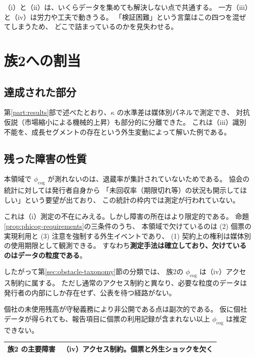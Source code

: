 （i）と（ii）は、いくらデータを集めても解決しない点で共通する。
一方（iii）と（iv）は労力や工夫で動きうる。
「検証困難」という言葉はこの四つを混ぜてしまうため、
どこで詰まっているのかを見失わせる。

\section{族2への割当}

\subsection{達成された部分}

第\ref{part:results}部で述べたとおり、$\kappa$ の水準差は媒体別パネルで測定でき、
対抗仮説（市場縮小による機械的上昇）も部分的に分離できた。
これは（iii）識別不能を、成長セグメントの存在という外生変動によって解いた例である。

\subsection{残った障害の性質}

本領域で $\phi_{\mathrm{cog}}$ が測れないのは、退蔵率が集計されていないためである。
協会の統計に対しては発行者自身から
「未回収率（期限切れ等）の状況も開示してほしい」という要望が出ており、
この統計の枠内では測定が行われていない。

これは（i）測定の不在にみえる。しかし障害の所在はより限定的である。
命題\ref{prop:phicog-requirements}の三条件のうち、
本領域で欠けているのは (2) 個票の実現利用と (3) 注意を強制する外生イベントであり、
(1) 契約上の権利は媒体別の使用期限として観測できる。
すなわち\textbf{測定手法は確立しており、欠けているのはデータの粒度である}。

したがって第\ref{sec:obstacle-taxonomy}節の分類では、
族2の $\phi_{\mathrm{cog}}$ は（iv）アクセス制約に属する。
ただし通常のアクセス制約と異なり、必要な粒度のデータは
発行者の内部にしか存在せず、公表を待つ経路がない。

個社の未使用残高が守秘義務により非公開である点は副次的である。
仮に個社データが得られても、報告項目に個票の利用記録が含まれない以上
$\phi_{\mathrm{cog}}$ は推定できない。

\begin{center}
\begin{tabularx}{\textwidth}{@{}lX@{}}
\toprule
族2 の主要障害 & （iv）アクセス制約。個票と外生ショックを欠く \\
\bottomrule
\end{tabularx}
\label{tab:family2-obstacle}
\end{center}

